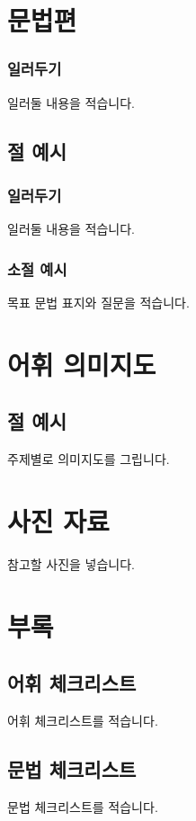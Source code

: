 \documentclass{snu-fl-questionnaire}
\begin{document}
\chapter{문법편}
\subsection{일러두기}
일러둘 내용을 적습니다.

\section{절 예시}
\subsection{일러두기}
일러둘 내용을 적습니다.

\subsection{소절 예시}
목표 문법 표지와 질문을 적습니다.


\chapter{어휘 의미지도}
\section{절 예시}
주제별로 의미지도를 그립니다.


\chapter{사진 자료}
참고할 사진을 넣습니다.


\chapter*{부록}
\begin{appendices}

\section{어휘 체크리스트}
어휘 체크리스트를 적습니다.


\section{문법 체크리스트}
문법 체크리스트를 적습니다.

\end{appendices}


\backmatter
\makebackcover
\end{document}
